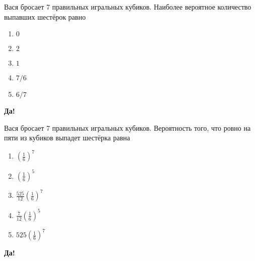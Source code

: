 \documentclass[t]{beamer}
\begin{document}
 \begin{frame} \label{7-Yes} 
\begin{block}{7} 

Вася бросает 7 правильных игральных кубиков. Наиболее вероятное количество выпавших шестёрок равно
     


 \end{block} 
\begin{enumerate} 
\item[] \hyperlink{7-No}{\beamergotobutton{} $0$}
\item[] \hyperlink{7-No}{\beamergotobutton{} $2$
}
\item[] \hyperlink{7-Yes}{\beamergotobutton{} $1$}
\item[] \hyperlink{7-No}{\beamergotobutton{} $7/6$}
\item[] \hyperlink{7-No}{\beamergotobutton{} $6/7$}
\end{enumerate} 

 \textbf{Да!} 
 \hyperlink{8}{}\end{frame} 


 \begin{frame} \label{8-Yes} 
\begin{block}{8} 

Вася бросает 7 правильных игральных кубиков. Вероятность того, что ровно на пяти из кубиков выпадет шестёрка равна
     


 \end{block} 
\begin{enumerate} 
\item[] \hyperlink{8-No}{\beamergotobutton{} $\left(\frac{1}{6}\right)^7$}
\item[] \hyperlink{8-No}{\beamergotobutton{} $\left(\frac{1}{6}\right)^5$}
\item[] \hyperlink{8-No}{\beamergotobutton{} $\frac{525}{12}\left(\frac{1}{6}\right)^7$}
\item[] \hyperlink{8-No}{\beamergotobutton{} $\frac{7}{12}\left(\frac{1}{6}\right)^5$}
\item[] \hyperlink{8-Yes}{\beamergotobutton{} $525\left(\frac{1}{6}\right)^7$}
\end{enumerate} 

 \textbf{Да!} 
 \hyperlink{9}{}\end{frame} 
\end{document}
